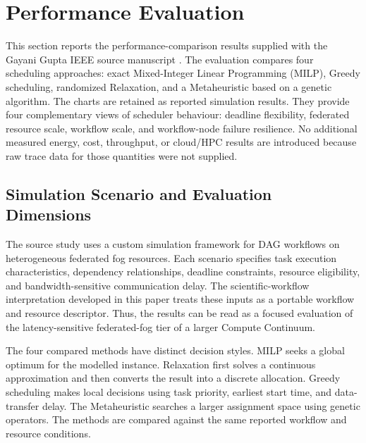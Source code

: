 \section{Performance Evaluation}
\label{performance_analysis}

This section reports the performance-comparison results supplied with the Gayani Gupta IEEE source manuscript \cite{gupta2025efficient}. The evaluation compares four scheduling approaches: exact Mixed-Integer Linear Programming (MILP), Greedy scheduling, randomized Relaxation, and a Metaheuristic based on a genetic algorithm. The charts are retained as reported simulation results. They provide four complementary views of scheduler behaviour: deadline flexibility, federated resource scale, workflow scale, and workflow-node failure resilience. No additional measured energy, cost, throughput, or cloud/HPC results are introduced because raw trace data for those quantities were not supplied.

\subsection{Simulation Scenario and Evaluation Dimensions}

The source study uses a custom simulation framework for DAG workflows on heterogeneous federated fog resources. Each scenario specifies task execution characteristics, dependency relationships, deadline constraints, resource eligibility, and bandwidth-sensitive communication delay. The scientific-workflow interpretation developed in this paper treats these inputs as a portable workflow and resource descriptor. Thus, the results can be read as a focused evaluation of the latency-sensitive federated-fog tier of a larger Compute Continuum.

The four compared methods have distinct decision styles. MILP seeks a global optimum for the modelled instance. Relaxation first solves a continuous approximation and then converts the result into a discrete allocation. Greedy scheduling makes local decisions using task priority, earliest start time, and data-transfer delay. The Metaheuristic searches a larger assignment space using genetic operators. The methods are compared against the same reported workflow and resource conditions.

